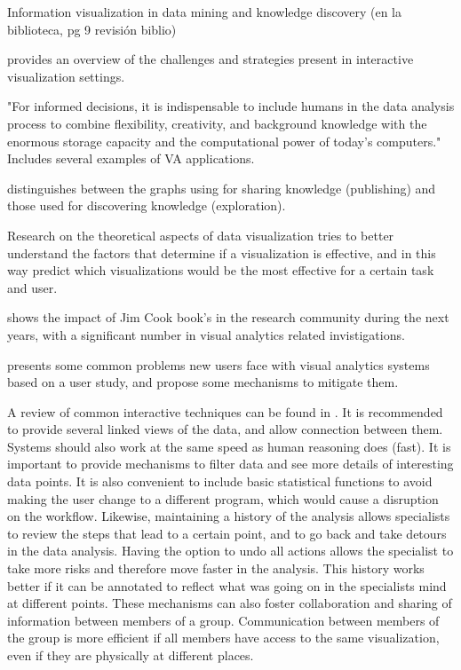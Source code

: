 \autocite{fayyad_information_2002}	Information visualization in data mining and knowledge discovery (en la biblioteca, pg 9 revisión biblio)


\autocite{spence_information_2007} provides an overview of the challenges and strategies present in interactive visualization settings.

\autocite{keim_visual_2008} "For informed decisions, it is indispensable to include humans in the data analysis process to combine flexibility, creativity, and background knowledge with the enormous storage capacity and the computational power of today’s computers." Includes several examples of VA applications.
	
\autocite{card_structure_1997}	distinguishes between the graphs using for sharing knowledge (publishing) and those used for discovering knowledge (exploration). 

Research on the theoretical aspects of data visualization \autocite{purchase_theoretical_2008} tries to better understand the factors that determine if a visualization is effective, and in this way predict which visualizations would be the most effective for a certain task and user.
	

\autocite{chen_illuminated_2012} shows the impact of Jim Cook book's in the research community during the next years, with a significant number in visual analytics related invistigations.
	
	
\autocite{chul_kwon_visual_2011} presents some common problems new users face with visual analytics systems based on a user study, and propose some mechanisms to mitigate them.
	
A review of common interactive techniques can be found in \autocite{heer_interactive_2012}. It is recommended to provide several linked views of the data, and allow connection between them. Systems should also work at the same speed as human reasoning does (fast). It is important to provide mechanisms to filter data and see more details of interesting data points. It is also convenient to include basic statistical functions to avoid making the user change to a different program, which would cause a disruption on the workflow. Likewise, maintaining a history of the analysis allows specialists to review the steps that lead to a certain point, and to go back and take detours in the data analysis. Having the option to undo all actions allows the specialist to take more risks and therefore move faster in the analysis. This history works better if it can be annotated to reflect what was going on in the specialists mind at different points. These mechanisms can also foster collaboration and sharing of information between members of a group. Communication between members of the group is more efficient if all members have access to the same visualization, even if they are physically at different places.


